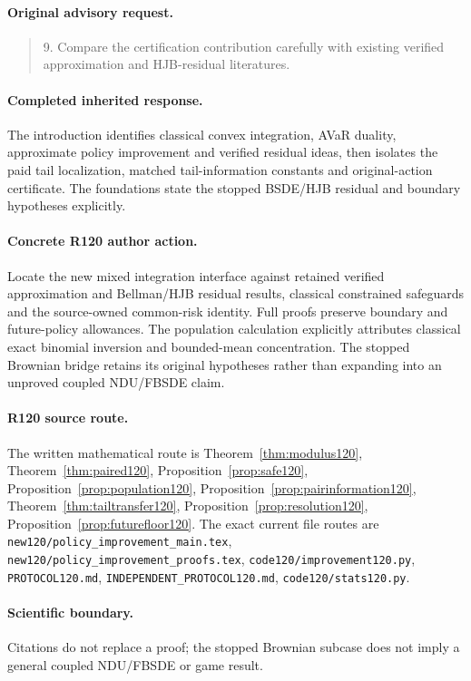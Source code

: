 \paragraph{Original advisory request.}
\begin{quote}
9. Compare the certification contribution carefully with existing verified approximation and HJB-residual literatures.
\end{quote}
\paragraph{Completed inherited response.}
The introduction identifies classical convex integration, AVaR duality, approximate policy improvement and verified residual ideas, then isolates the paid tail localization, matched tail-information constants and original-action certificate. The foundations state the stopped BSDE/HJB residual and boundary hypotheses explicitly.
\paragraph{Concrete R120 author action.}
Locate the new mixed integration interface against retained verified approximation and Bellman/HJB residual results, classical constrained safeguards and the source-owned common-risk identity. Full proofs preserve boundary and future-policy allowances. The population calculation explicitly attributes classical exact binomial inversion and bounded-mean concentration. The stopped Brownian bridge retains its original hypotheses rather than expanding into an unproved coupled NDU/FBSDE claim.
\paragraph{R120 source route.}
The written mathematical route is Theorem~\ref{thm:modulus120}, Theorem~\ref{thm:paired120}, Proposition~\ref{prop:safe120}, Proposition~\ref{prop:population120}, Proposition~\ref{prop:pairinformation120}, Theorem~\ref{thm:tailtransfer120}, Proposition~\ref{prop:resolution120}, Proposition~\ref{prop:futurefloor120}. The exact current file routes are \nolinkurl{new120/policy_improvement_main.tex}, \nolinkurl{new120/policy_improvement_proofs.tex}, \nolinkurl{code120/improvement120.py}, \nolinkurl{PROTOCOL120.md}, \nolinkurl{INDEPENDENT_PROTOCOL120.md}, \nolinkurl{code120/stats120.py}.
\paragraph{Scientific boundary.}
Citations do not replace a proof; the stopped Brownian subcase does not imply a general coupled NDU/FBSDE or game result.

